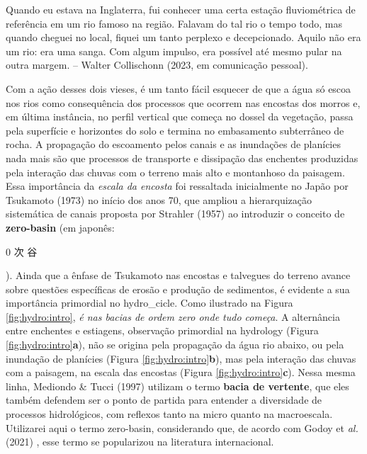 \documentclass[./main.tex]{subfiles}
\begin{document}
\begin{adjustwidth}{100pt}{0pt}
\medskip
\small Quando eu estava na Inglaterra, fui conhecer uma certa estação fluviométrica de referência em um rio famoso na região. Falavam do tal rio o tempo todo, mas quando cheguei no local, fiquei um tanto perplexo e decepcionado. Aquilo não era um rio: era uma sanga. Com algum impulso, era possível até mesmo pular na outra margem. -- Walter Collischonn (2023, em comunicação pessoal).
\medskip
\end{adjustwidth}

\noindent Com a ação desses dois vieses, é um tanto fácil esquecer de que a água só escoa nos rios como consequência dos processos que ocorrem nas encostas dos morros e, em última instância, no perfil vertical que começa no dossel da vegetação, passa pela superfície e horizontes do solo e termina no embasamento subterrâneo de rocha. A propagação do escoamento pelos canais e as inundações de planícies nada mais são que processos de transporte e dissipação das enchentes produzidas pela interação das chuvas com o terreno mais alto e montanhoso da paisagem. Essa importância da \textit{escala da encosta} foi ressaltada inicialmente no Japão por Tsukamoto (1973) \cite{tsukamoto1973} no início dos anos 70, que ampliou a hierarquização sistemática de canais proposta por Strahler (1957) \cite{strahler1957} ao introduzir o conceito de \textbf{\gls{zero-basin}} (em japonês: \begin{CJK}{UTF8}{min}0 次 谷\end{CJK}). Ainda que a ênfase de Tsukamoto nas encostas e talvegues do terreno avance sobre questões específicas de erosão e produção de sedimentos, é evidente a sua importância primordial no \gls{hydro_cicle}. Como ilustrado na Figura \ref{fig:hydro:intro}, \textit{é nas bacias de ordem zero onde tudo começa}. A alternância entre enchentes e estiagens, observação primordial na \gls{hydrology} (Figura \ref{fig:hydro:intro}\textbf{a}), não se origina pela propagação da água rio abaixo, ou pela inundação de planícies (Figura \ref{fig:hydro:intro}\textbf{b}), mas pela interação das chuvas com a paisagem, na escala das encostas (Figura \ref{fig:hydro:intro}\textbf{c}). Nessa mesma linha, Mediondo \& Tucci (1997) \cite{mediondo1997} utilizam o termo \textbf{bacia de vertente}, que eles também defendem ser o ponto de partida para entender a diversidade de processos hidrológicos, com reflexos tanto na micro quanto na macroescala. Utilizarei aqui o termo \gls{zero-basin}, considerando que, de acordo com Godoy et \textit{al.} (2021) \cite{godoy2021}, esse termo se popularizou na literatura internacional.
\end{document}
